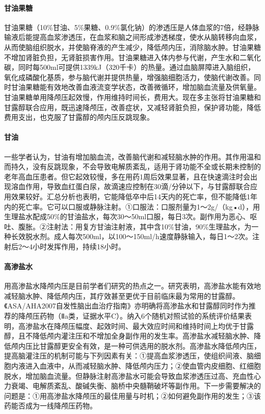 \paragraph{甘油果糖}

甘油果糖（10\%甘油、5\%果糖、0.9\%氯化钠）的渗透压是人体血浆的7倍，经静脉输液后能提高血浆渗透压，在血浆和脑之间形成渗透梯度，使水从脑转移向血浆，从而使脑组织脱水，并使脑脊液的产生减少，降低颅内压，消除脑水肿。甘油果糖不增加肾脏负担，无肾脏损害作用。甘油果糖进入体内参与代谢，产生水和二氧化碳，同时每500ml可提供1339kJ（320千卡）的热量。通过血脑屏障进入脑组织，氧化成磷酸化基质，参与脑代谢并提供热量，增强脑细胞活力，使脑代谢改善。同时甘油果糖能有效地改善血液流变学状态，改善微循环，增加脑血流量及供氧量。甘油果糖单用降颅压起效慢，作用维持时间长，费用大。现在多主张将甘油果糖和甘露醇联合应用，既迅速降颅压，改善症状，又减轻肾脏负担，保护肾功能，降低费用支出，也克服了甘露醇的颅内压反跳现象。

\paragraph{甘油}

一些学者认为，甘油有增加脑血流，改善脑代谢和减轻脑水肿的作用。其作用温和而持久，没有反跳现象，不会导致电解质紊乱，适用于肾功能不全或长期未控制的老年高血压患者。但它起效较慢，多在用药1周后效果显著，且在快速滴注时会出现溶血作用，导致血红蛋白尿，故滴速应控制在30滴/分钟以下，与甘露醇联合应用效果较好。汇总分析也表明，它能降低卒中后14天内的死亡率，但不能降低1年内的死亡率。它可以口服或静脉注射。①口服法：口服剂量为1～2g/（kg•d），用生理盐水配成50\%的甘油盐水，每次30～50ml口服，每日3次。副作用为恶心、呕吐、腹胀。②注射法：用复方甘油注射液，其中含10\%甘油，90\%生理盐水，为一种长效脱水剂。成人每次500ml，以100～150ml/h速度静脉输入，每日1～2次。注射后2～4小时发挥作用，持续18小时。

\paragraph{高渗盐水}

用高渗盐水降颅内压是目前学者们研究的热点之一。研究表明，高渗盐水能有效地减轻脑水肿、降低颅内压，其疗效甚至更优于目前临床最为常用的甘露醇。《ASA/AHA2007自发性脑出血治疗指南》亦明确将高渗盐水和甘露醇同时作为推荐的降颅压药物（Ⅱa类，证据水平C）。纳入6个随机对照试验的系统评价结果表明，高渗盐水在降颅压幅度、起效时间、最大效应时间和维持时间上均优于甘露醇，且不降低颅内灌注压和不增加全身副作用的发生率。高渗盐水减轻脑水肿、降低颅内压比甘露醇更安全有效，是一种可供选用的脱水剂。高渗盐水降低颅内压，提高脑灌注压的机制可能与下列因素有关：①提高血浆渗透压，使组织间液、脑细胞内液进入血液中，从而减轻脑水肿、降低颅内压力；②使血管内皮细胞、红细胞脱水，增加脑血流量。但静脉注射高渗盐水可能会导致血浆渗透压过高、充血性心力衰竭、电解质紊乱、酸碱失衡、脑桥中央髓鞘破坏等副作用。下一步需要解决的问题是：①用高渗盐水降颅压的最佳用量与时机；②如何避免副作用的发生；③该药能否成为一线降颅压药物。

